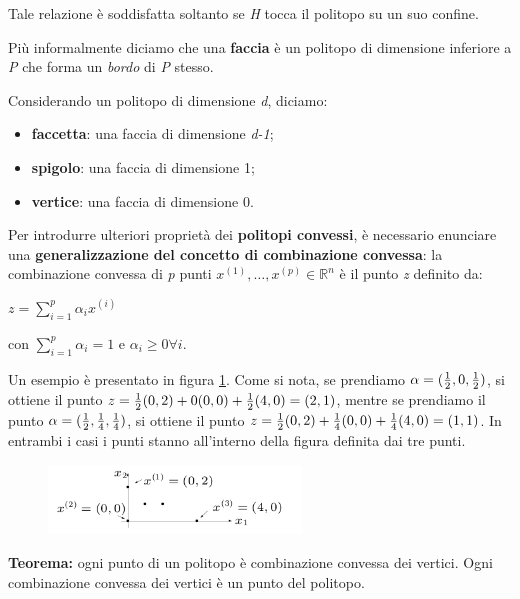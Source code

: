 \documentclass[11pt]{book}
\begin{document}
Tale relazione \`e soddisfatta soltanto se {\em H} tocca il politopo
su un suo confine.

Pi\`u informalmente diciamo che una {\bf faccia} \`e un politopo di
dimensione inferiore a {\em P} che forma un {\em bordo} di {\em P}
stesso.

Considerando un politopo di dimensione {\em d}, diciamo:

\begin{itemize}
\item {\bf faccetta}: una faccia di dimensione {\em d-1};
\item {\bf spigolo}: una faccia di dimensione 1;
\item {\bf vertice}: una faccia di dimensione 0.
\end{itemize}


Per introdurre ulteriori propriet\`a dei {\bf politopi convessi}, \`e
necessario enunciare una {\bf generalizzazione del concetto di combinazione
convessa}: la combinazione convessa di {\em p} punti
$x^{(1)},\dots,x^{(p)} \in \mathbb{R}^n$ \`e il punto {\em z} definito
da:

\begin{center}
$z = \sum\limits_{i=1}^p \alpha_i x^{(i)}$
\end{center}

con $\sum\limits_{i=1}^p \alpha_i = 1$ e $\alpha_i \geq 0 \forall i$.

Un esempio \`e presentato in figura \ref{comb3}. Come si nota, se
prendiamo $\alpha=({1 \over 2}, 0, {1 \over 2})$, si ottiene il punto
$z={1 \over 2} (0,2) + 0 (0,0) + {1 \over 2} (4,0)=(2,1)$, mentre se
prendiamo il punto $\alpha=({1 \over 2}, {1 \over 4}, {1 \over 4})$,
si ottiene il punto $z={1 \over 2} (0,2) + {1 \over 4} (0,0) + {1
  \over 4} (4,0)=(1,1)$. In entrambi i casi i punti stanno all'interno
della figura definita dai tre punti.\newline

\begin{figure}[h!]
  \centering
  \includegraphics[width=0.6\textwidth]{images/comb3.png}
  \label{comb3}
\end{figure}

\vspace{11pt}
{\bf Teorema:} ogni punto di un politopo \`e combinazione convessa dei
vertici. Ogni combinazione convessa dei vertici \`e un punto del
politopo.
\newline\vspace{11pt}
 
\end{document}
